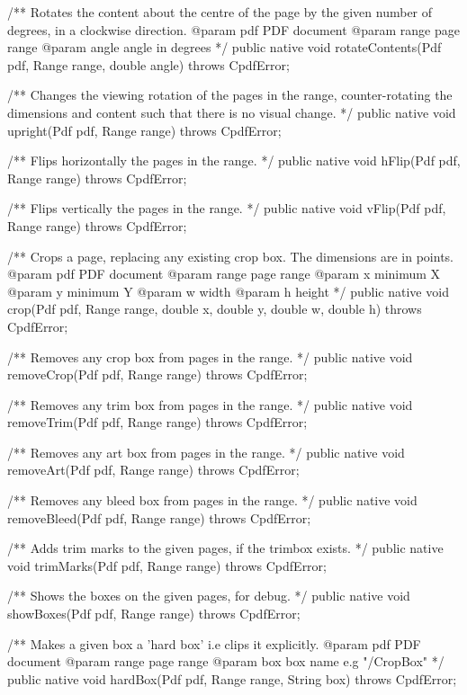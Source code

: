 /** Rotates the content about the centre of the page by the given number of
degrees, in a clockwise direction.
@param pdf PDF document
@param range page range
@param angle angle in degrees
*/
public native void rotateContents(Pdf pdf, Range range, double angle)
    throws CpdfError;

/** Changes the viewing rotation of the pages in the range,
counter-rotating the dimensions and content such that there is no visual
change. */
public native void upright(Pdf pdf, Range range) throws CpdfError;

/** Flips horizontally the pages in the range. */
public native void hFlip(Pdf pdf, Range range) throws CpdfError;

/** Flips vertically the pages in the range. */
public native void vFlip(Pdf pdf, Range range) throws CpdfError;

/** Crops a page, replacing any existing crop box. The dimensions are in
points.
@param pdf PDF document
@param range page range
@param x minimum X
@param y minimum Y
@param w width
@param h height */
public native void crop(Pdf pdf, Range range, double x, double y, double w,
                        double h)
    throws CpdfError;

/** Removes any crop box from pages in the range. */
public native void removeCrop(Pdf pdf, Range range) throws CpdfError;

/** Removes any trim box from pages in the range. */
public native void removeTrim(Pdf pdf, Range range) throws CpdfError;

/** Removes any art box from pages in the range. */
public native void removeArt(Pdf pdf, Range range) throws CpdfError;

/** Removes any bleed box from pages in the range. */
public native void removeBleed(Pdf pdf, Range range) throws CpdfError;

/** Adds trim marks to the given pages, if the trimbox exists. */
public native void trimMarks(Pdf pdf, Range range) throws CpdfError;

/** Shows the boxes on the given pages, for debug. */
public native void showBoxes(Pdf pdf, Range range) throws CpdfError;

/** Makes a given box a 'hard box' i.e clips it explicitly.
@param pdf PDF document
@param range page range
@param box box name e.g "/CropBox" */
public native void hardBox(Pdf pdf, Range range, String box)
    throws CpdfError;

